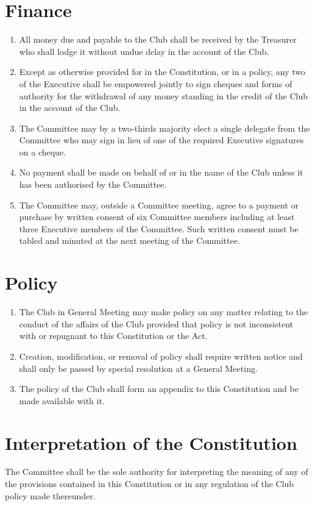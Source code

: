 \documentclass[11pt]{article} %
\begin{document}
\section{Finance}
\begin{enumerate}
	\item All money due and payable to the Club shall be received by the Treasurer who shall lodge it without undue delay in the account of the Club.
	\item Except as otherwise provided for in the Constitution, or in a policy, any two of the Executive shall be empowered jointly to sign cheques and forms of authority for the withdrawal of any money standing in the credit of the Club in the account of the Club.
	\item The Committee may by a two-thirds majority elect a single delegate from the Committee who may sign in lieu of one of the required Executive signatures on a cheque.
	\item No payment shall be made on behalf of or in the name of the Club unless it has been authorised by the Committee.
	\item The Committee may, outside a Committee meeting, agree to a payment or purchase by written consent of six Committee members including at least three Executive members of the Committee. Such written consent must be tabled and minuted at the next meeting of the Committee.
\end{enumerate}

\section{Policy}
\begin{enumerate}
	\item The Club in General Meeting may make policy on any matter relating to the conduct of the affairs of the Club provided that policy is not inconsistent with or repugnant to this Constitution or the Act.
	\item Creation, modification, or removal of policy shall require written notice and shall only be passed by special resolution at a General Meeting.
	\item The policy of the Club shall form an appendix to this Constitution and be made available with it.
\end{enumerate}

\section{Interpretation of the Constitution}
The Committee shall be the sole authority for interpreting the meaning of any of the provisions contained in this Constitution or in any regulation of the Club policy made thereunder.
\end{document}
